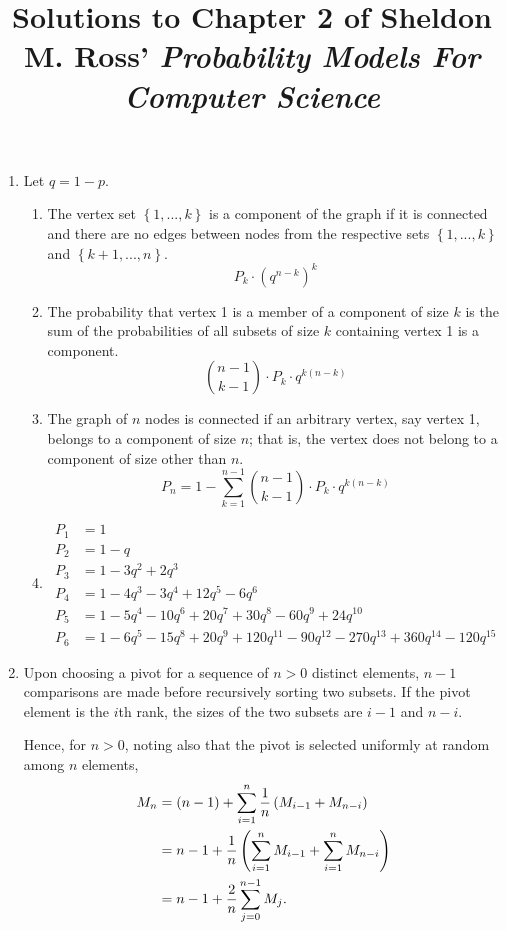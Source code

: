 \documentclass{article}
\title{Solutions to Chapter 2 of Sheldon M. Ross' \textit{Probability Models For Computer Science}}
\date{}
\begin{document}
    \maketitle
\begin{enumerate}
\item
    Let $q=1-p$.
    \begin{enumerate}
    \item
        The vertex set $\left\{1,...,k\right\}$ is a component of the graph if it is connected and
        there are no edges between nodes from the respective sets $\left\{1,...,k\right\}$ and $\left\{k+1,...,n\right\}$.
        \[ P_k \cdot \left(q^{n-k}\right)^k \]

    \item
        The probability that vertex 1 is a member of a component of size $k$ is the sum of the probabilities of all
        subsets of size $k$ containing vertex 1 is a component.
        \[ {n-1 \choose k-1} \cdot P_k \cdot q^{k(n-k)} \]

    \item
        The graph of $n$ nodes is connected if an arbitrary vertex, say vertex 1, belongs to a component of size $n$; that is,
        the vertex does not belong to a component of size other than $n$.
        \[ P_n = 1 - \sum_{k=1}^{n-1} {n-1 \choose k-1} \cdot P_k \cdot q^{k(n-k)} \]
    \item
        \[\begin{split}
            P_1     & = 1 \\
            P_2     & = 1 - q \\
            P_3     & = 1 - 3q^2 + 2q^3 \\
            P_4     & = 1 - 4q^3 - 3q^4 + 12q^5 - 6q^6 \\
            P_5     & = 1 - 5q^4 - 10q^6 + 20q^7 + 30q^8 - 60q^9 + 24q^{10} \\
            P_6     & = 1 - 6q^5 - 15q^8 + 20q^9 + 120q^{11} - 90q^{12} - 270q^{13} + 360q^{14} - 120q^{15}
        \end{split}\]
    \end{enumerate}
\item
    Upon choosing a pivot for a sequence of $n>0$ distinct elements, $n-1$ comparisons are made before recursively sorting two subsets.
    If the pivot element is the $i$th rank, the sizes of the two subsets are $i-1$ and $n-i$.

    Hence, for $n>0$, noting also that the pivot is selected uniformly at random among $n$ elements,
    \[\begin{split}
    M_n & = (n-1) + \sum_{i=1}^n \frac{1}{n} \left( M_{i-1} + M_{n-i} \right ) \\
        & = n - 1 + \frac{1}{n} \left( \sum_{i=1}^n M_{i-1} + \sum_{i=1}^n M_{n-i} \right) \\
        & = n - 1 + \frac{2}{n} \sum_{j=0}^{n-1} M_j \text.
    \end{split}\]


\end{enumerate}
\end{document}
